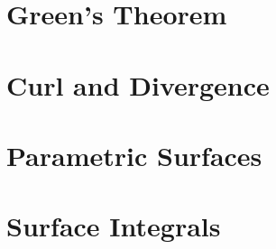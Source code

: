 \documentclass{article}
\begin{document}
\newpage
\section{Green's Theorem}

\newpage
\section{Curl and Divergence}

\newpage
\section{Parametric Surfaces}

\newpage
\section{Surface Integrals}
\end{document}
